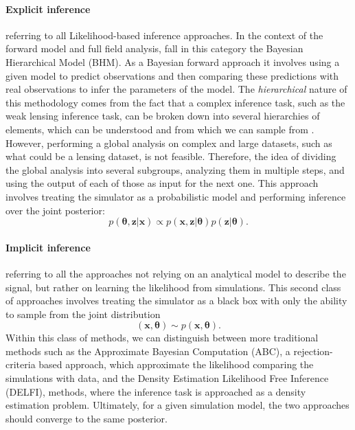 \documentclass{aa}
\begin{document}
\paragraph{\textbf{Explicit inference}} referring to all Likelihood-based inference approaches. 
In the context of the forward model and full field analysis, fall in this category the Bayesian Hierarchical Model (BHM).
As a Bayesian forward approach it involves using a given model to predict observations and then comparing these predictions with real observations to infer the parameters of the model. The \textit{hierarchical} nature of this methodology comes from the fact that a complex inference task, such as the weak lensing inference task, can be broken down into several hierarchies of elements, which can be understood and from which we can sample from \citep{heavens2018bayesian}. However, performing a global analysis on complex and large datasets, such as what could be a lensing dataset, is not feasible. Therefore, the idea of dividing the global analysis into several subgroups, analyzing them in multiple steps, and using the output of each of those as input for the next one.  
This approach involves treating the simulator as a probabilistic model and performing inference over the joint posterior:
\begin{equation}
        p(\bm{\theta},\bm{z}|\bm{x})\propto  p(\bm{x},\bm{z}|\bm{\theta}) p(\bm{z}|\bm{\theta}).
\end{equation}
\paragraph{\textbf{Implicit inference}} referring to all the approaches not relying on an analytical model to describe the signal, but rather on learning the likelihood from simulations. This second class of approaches involves treating the simulator as a black box with only the ability to sample from the joint distribution
\begin{equation}
    (\bm{x}, \bm{\theta})\sim p(\bm{x}, \bm{\theta}).
\end{equation}
Within this class of methods, we can distinguish between more traditional methods such as the Approximate Bayesian Computation (ABC), a rejection-criteria based approach, which approximate the likelihood comparing the simulations with data, and the Density Estimation Likelihood Free Inference (DELFI), methods, where the inference task is approached as a density estimation problem.
Ultimately, for a given simulation model, the two approaches should converge to the same posterior.
\end{document}
